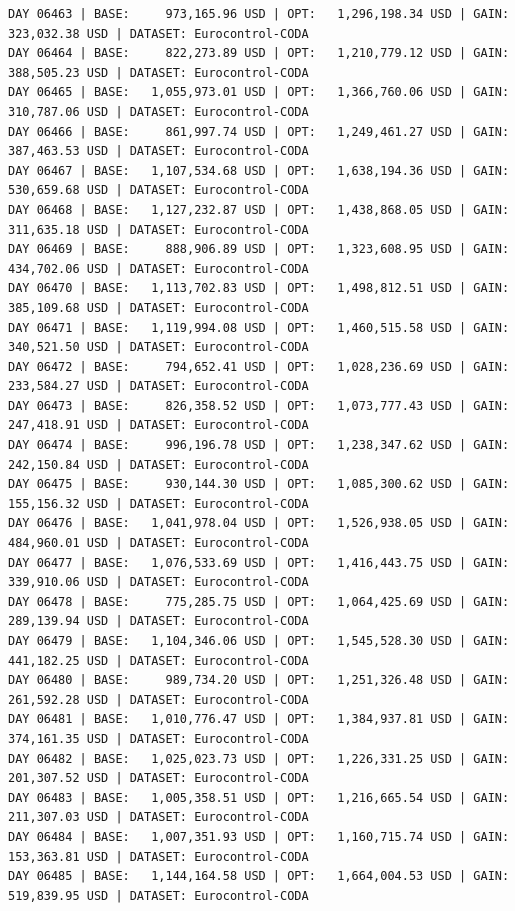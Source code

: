\documentclass[11pt,a4paper]{article}
\begin{document}
\begin{verbatim}
DAY 06463 | BASE:     973,165.96 USD | OPT:   1,296,198.34 USD | GAIN: 323,032.38 USD | DATASET: Eurocontrol-CODA
DAY 06464 | BASE:     822,273.89 USD | OPT:   1,210,779.12 USD | GAIN: 388,505.23 USD | DATASET: Eurocontrol-CODA
DAY 06465 | BASE:   1,055,973.01 USD | OPT:   1,366,760.06 USD | GAIN: 310,787.06 USD | DATASET: Eurocontrol-CODA
DAY 06466 | BASE:     861,997.74 USD | OPT:   1,249,461.27 USD | GAIN: 387,463.53 USD | DATASET: Eurocontrol-CODA
DAY 06467 | BASE:   1,107,534.68 USD | OPT:   1,638,194.36 USD | GAIN: 530,659.68 USD | DATASET: Eurocontrol-CODA
DAY 06468 | BASE:   1,127,232.87 USD | OPT:   1,438,868.05 USD | GAIN: 311,635.18 USD | DATASET: Eurocontrol-CODA
DAY 06469 | BASE:     888,906.89 USD | OPT:   1,323,608.95 USD | GAIN: 434,702.06 USD | DATASET: Eurocontrol-CODA
DAY 06470 | BASE:   1,113,702.83 USD | OPT:   1,498,812.51 USD | GAIN: 385,109.68 USD | DATASET: Eurocontrol-CODA
DAY 06471 | BASE:   1,119,994.08 USD | OPT:   1,460,515.58 USD | GAIN: 340,521.50 USD | DATASET: Eurocontrol-CODA
DAY 06472 | BASE:     794,652.41 USD | OPT:   1,028,236.69 USD | GAIN: 233,584.27 USD | DATASET: Eurocontrol-CODA
DAY 06473 | BASE:     826,358.52 USD | OPT:   1,073,777.43 USD | GAIN: 247,418.91 USD | DATASET: Eurocontrol-CODA
DAY 06474 | BASE:     996,196.78 USD | OPT:   1,238,347.62 USD | GAIN: 242,150.84 USD | DATASET: Eurocontrol-CODA
DAY 06475 | BASE:     930,144.30 USD | OPT:   1,085,300.62 USD | GAIN: 155,156.32 USD | DATASET: Eurocontrol-CODA
DAY 06476 | BASE:   1,041,978.04 USD | OPT:   1,526,938.05 USD | GAIN: 484,960.01 USD | DATASET: Eurocontrol-CODA
DAY 06477 | BASE:   1,076,533.69 USD | OPT:   1,416,443.75 USD | GAIN: 339,910.06 USD | DATASET: Eurocontrol-CODA
DAY 06478 | BASE:     775,285.75 USD | OPT:   1,064,425.69 USD | GAIN: 289,139.94 USD | DATASET: Eurocontrol-CODA
DAY 06479 | BASE:   1,104,346.06 USD | OPT:   1,545,528.30 USD | GAIN: 441,182.25 USD | DATASET: Eurocontrol-CODA
DAY 06480 | BASE:     989,734.20 USD | OPT:   1,251,326.48 USD | GAIN: 261,592.28 USD | DATASET: Eurocontrol-CODA
DAY 06481 | BASE:   1,010,776.47 USD | OPT:   1,384,937.81 USD | GAIN: 374,161.35 USD | DATASET: Eurocontrol-CODA
DAY 06482 | BASE:   1,025,023.73 USD | OPT:   1,226,331.25 USD | GAIN: 201,307.52 USD | DATASET: Eurocontrol-CODA
DAY 06483 | BASE:   1,005,358.51 USD | OPT:   1,216,665.54 USD | GAIN: 211,307.03 USD | DATASET: Eurocontrol-CODA
DAY 06484 | BASE:   1,007,351.93 USD | OPT:   1,160,715.74 USD | GAIN: 153,363.81 USD | DATASET: Eurocontrol-CODA
DAY 06485 | BASE:   1,144,164.58 USD | OPT:   1,664,004.53 USD | GAIN: 519,839.95 USD | DATASET: Eurocontrol-CODA

\end{verbatim}
\end{document}
